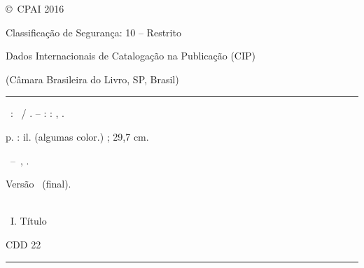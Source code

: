 

{
  \ABNTEXchapterfont\setlength{\parindent}{0cm}
  
  \vspace*{\fill} 
  
  \copyright\ CPAI 2016
  
  Classificação de Segurança: 10  -- Restrito
  
  \vspace*{\fill} %
  
  \begin{fichacatalografica}\ABNTEXchapterfont
    \vspace*{\fill} %
    \begin{center}
      {\scriptsize Dados Internacionais de Catalogação na Publicação (CIP)} 
      
      {\scriptsize (Câmara Brasileira do Livro, SP, Brasil)} 
    \end{center}
    \hrule %
    \begin{center} %
      \begin{minipage}[c]{13cm} %
        \imprimirautor
        
        \hspace{0.5cm} \projeto\ : \imprimirtitulo\ / \imprimirautor. --
        \imprimirlocal : \UNB : \CPAI, \imprimirdata.
        
        \hspace{0.5cm} \pageref{LastPage} p. : il. (algumas color.) ; 29,7 cm.\\
        
        \hspace{0.5cm}
        \parbox[t]{\textwidth}{\imprimirtipotrabalho~--~\CPAI, \imprimirdata.}
        
        \hspace{0.5cm}
        \parbox[t]{\textwidth}{Versão \versao\ (final).}\\
        
        
        \hspace{0.5cm}
        \kwords\ I. Título
        \begin{flushright}
          CDD 22
        \end{flushright}
      \end{minipage}
    \end{center}
    \hrule
  \end{fichacatalografica}
  
  \cleardoublepage
}

